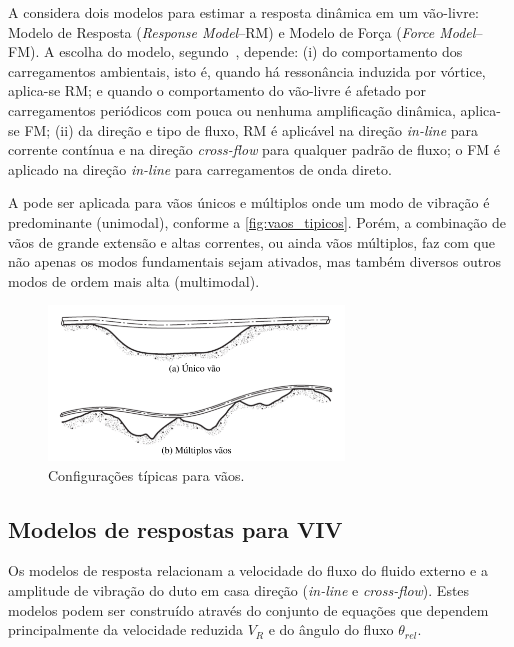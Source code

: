 A  considera dois modelos para estimar a resposta dinâmica em um vão-livre: Modelo de Resposta (\textit{Response Model}--RM) e Modelo de Força (\textit{Force Model}--FM).
A escolha do modelo, segundo~, depende: (i) do comportamento dos carregamentos ambientais, isto é, quando há ressonância induzida por vórtice, aplica-se RM\@; e quando o comportamento do vão-livre é afetado por carregamentos periódicos com pouca ou nenhuma amplificação dinâmica, aplica-se FM\@; (ii) da direção e tipo de fluxo, RM é aplicável na direção \textit{in-line} para corrente contínua e na direção \textit{cross-flow} para qualquer padrão de fluxo; o FM é aplicado na direção \textit{in-line} para carregamentos de onda direto.

A  pode ser aplicada para vãos únicos e múltiplos onde um modo de vibração é predominante (unimodal), conforme a \autoref{fig:vaos_tipicos}.
Porém, a combinação de vãos de grande extensão e altas correntes, ou ainda vãos múltiplos, faz com que não apenas os modos fundamentais sejam ativados, mas também diversos outros modos de ordem mais alta (multimodal).

\begin{figure}[!ht]
	\centering
    \caption{Configurações típicas para vãos.}\label{fig:vaos_tipicos}
	\includegraphics[width=0.7\textwidth]{imagens/vaos_tipicos}
\end{figure}

\pagebreak
\subsection{Modelos de respostas para VIV}

Os modelos de resposta relacionam a velocidade do fluxo do fluido externo e a amplitude de vibração do duto em casa direção (\textit{in-line} e \textit{cross-flow}). Estes modelos podem ser construído através do conjunto de equações que dependem principalmente da velocidade reduzida $V_R$ e do ângulo do fluxo $\theta_\mathit{rel}$.

